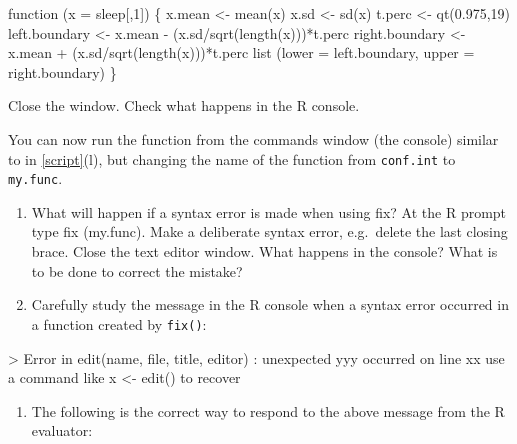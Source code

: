 \documentclass[
]{book}
\newenvironment{Shaded}{\begin{snugshade}}{\end{snugshade}}
\newcommand{\NormalTok}[1]{#1}
\providecommand{\tightlist}{%
  \setlength{\itemsep}{0pt}\setlength{\parskip}{0pt}}
\begin{document}
\begin{Shaded}
\begin{Highlighting}[]
\NormalTok{function (x = sleep[,1])}
\NormalTok{\{}
\NormalTok{  x.mean \textless{}{-} mean(x)\textasciigrave{}}
\NormalTok{  x.sd \textless{}{-} sd(x)}
\NormalTok{  t.perc \textless{}{-} qt(0.975,19)}
\NormalTok{  left.boundary \textless{}{-} x.mean {-} (x.sd/sqrt(length(x)))*t.perc}
\NormalTok{  right.boundary \textless{}{-} x.mean + (x.sd/sqrt(length(x)))*t.perc}
\NormalTok{  list (lower = left.boundary, upper = right.boundary)}
\NormalTok{\}}
\end{Highlighting}
\end{Shaded}

Close the window. Check what happens in the R console.

You can now run the function from the commands window (the console) similar to in \ref{script}(l), but changing the name of the function from \texttt{conf.int} to \texttt{my.func}.

\begin{enumerate}
\def\labelenumi{(\alph{enumi})}
\setcounter{enumi}{1}
\item
  What will happen if a syntax error is made when using fix? At the R prompt type fix (my.func). Make a deliberate syntax error, e.g.~delete the last closing brace. Close the text editor window. What happens in the console? What is to be done to correct the mistake?
\item
  Carefully study the message in the R console when a syntax error occurred in a function created by \texttt{fix()}:
\end{enumerate}

\begin{Shaded}
\begin{Highlighting}[]
\NormalTok{\textgreater{} Error in edit(name, file, title, editor) :}
\NormalTok{    unexpected \textquotesingle{}yyy\textquotesingle{} occurred on line xx}
\NormalTok{    use a command like}
\NormalTok{    x \textless{}{-} edit()}
\NormalTok{    to recover}
\end{Highlighting}
\end{Shaded}

\begin{enumerate}
\def\labelenumi{(\alph{enumi})}
\setcounter{enumi}{3}
\tightlist
\item
  The following is the correct way to respond to the above message from the R evaluator:
\end{enumerate}
\end{document}
